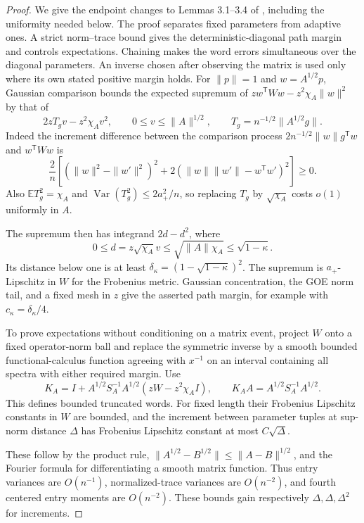 \begin{proof}
We give the endpoint changes to Lemmas 3.1--3.4 of
\cite{AcceptedGap}, including the uniformity needed below. The proof
separates fixed parameters from adaptive ones. A strict norm--trace bound
gives the deterministic-diagonal path margin and controls expectations.
Chaining makes the word errors simultaneous over the diagonal parameters.
An inverse chosen after observing the matrix is used only where its own
stated positive margin holds.
For $\|p\|=1$ and $w=A^{1/2}p$, Gaussian comparison bounds the expected
supremum of
$zw^{\mathsf T}Ww-z^2\chi_A\|w\|^2$ by that of
\[
 2zT_g v-z^2\chi_Av^2,
 \qquad 0\le v\le\|A\|^{1/2},\qquad
 T_g=n^{-1/2}\|A^{1/2}g\|.
\]
Indeed the increment difference between the comparison process
$2n^{-1/2}\|w\|g^{\mathsf T}w$ and $w^{\mathsf T}Ww$ is
\[
 \frac2n\left[(\|w\|^2-\|w'\|^2)^2
       +2(\|w\|\|w'\|-w^{\mathsf T}w')^2\right]\ge0.
\]
Also $\mathbb E T_g^2=\chi_A$ and
$\operatorname{Var}(T_g^2)\le2a_+^2/n$, so replacing $T_g$ by
$\sqrt{\chi_A}$ costs $o(1)$ uniformly in $A$.

The supremum then has
integrand $2d-d^2$, where
\[
 0\le d=z\sqrt{\chi_A}v\le\sqrt{\|A\|\chi_A}
 \le\sqrt{1-\kappa}.
\]
Its distance below one is at least
$\delta_\kappa=(1-\sqrt{1-\kappa})^2$.
The supremum is $a_+$-Lipschitz in $W$ for the Frobenius metric.
Gaussian concentration, the GOE norm tail, and a fixed mesh in $z$
give the asserted path margin, for example with
$c_\kappa=\delta_\kappa/4$.

To prove expectations without conditioning on a matrix event, project
$W$ onto a fixed operator-norm ball and replace the symmetric inverse
by a smooth bounded functional-calculus function agreeing with $x^{-1}$
on an interval containing all spectra with either required margin.
Use
\[
 K_A=I+A^{1/2}S_A^{-1}A^{1/2}(zW-z^2\chi_AI),\qquad
 K_AA=A^{1/2}S_A^{-1}A^{1/2}.
\]
This defines bounded truncated words.  For fixed length their
Frobenius Lipschitz constants in $W$ are bounded, and the increment
between parameter tuples at sup-norm distance $\Delta$ has
Frobenius Lipschitz constant at most $C\sqrt\Delta$.

These follow by the
product rule, $\|A^{1/2}-B^{1/2}\|\le\|A-B\|^{1/2}$, and the
Fourier formula for differentiating a smooth matrix function.  Thus
entry variances are $O(n^{-1})$, normalized-trace variances are
$O(n^{-2})$, and fourth centered entry moments are $O(n^{-2})$.
These bounds gain respectively $\Delta,\Delta,\Delta^2$ for increments.


\end{proof}
